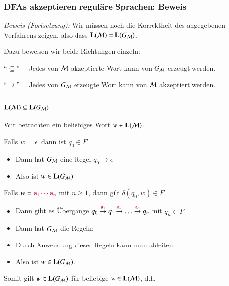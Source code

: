 \documentclass[aspectratio=1610,onlymath]{beamer}
\begin{document}
\begin{frame}\frametitle{DFAs akzeptieren reguläre Sprachen: Beweis}

\bigskip


\emph{Beweis (Fortsetzung):} Wir müssen noch die Korrektheit des angegebenen Verfahrens zeigen, also dass $\textbf{\textcolor{black}{L}}(\mathcal{M})=\textbf{\textcolor{black}{L}}(G_{\mathcal{M}})$.
\medskip

Dazu beweisen wir beide Richtungen einzeln:
\bigskip

\alert{"`$\subseteq$"'}~~ Jedes von $\mathcal{M}$ akzeptierte Wort kann von $G_{\mathcal{M}}$ erzeugt werden.
\bigskip

\alert{"`$\supseteq$"'}~~ Jedes von $G_{\mathcal{M}}$ erzeugte Wort kann von $\mathcal{M}$ akzeptiert werden.

\end{frame}

\begin{frame}\frametitle{$\textbf{\textcolor{black}{L}}(\mathcal{M})\subseteq\textbf{\textcolor{black}{L}}(G_{\mathcal{M}})$}

Wir betrachten ein beliebiges Wort $w\in\textbf{\textcolor{black}{L}}(\mathcal{M})$.\pause
\medskip

Falls $w=\epsilon$, dann ist $q_0\in F$.\pause
\begin{itemize}
\item Dann hat $G_{\mathcal{M}}$ eine Regel $q_0\to\epsilon$
\item Also ist $w\in\textbf{\textcolor{black}{L}}(G_{\mathcal{M}})$\pause
\end{itemize}
\medskip

Falls $w=\mathtt{\textcolor{purple}{a_1\cdots a_n}}$ mit $n\geq 1$, dann gilt $\delta(q_0,w)\in F$.\pause
\begin{itemize}
\item Dann gibt es Übergänge $q_0 \stackrel{\mathtt{\textcolor{purple}{a_1}}}{\to} q_1 \stackrel{\mathtt{\textcolor{purple}{a_2}}}{\to} \ldots \stackrel{\mathtt{\textcolor{purple}{a_n}}}{\to} q_n$ mit $q_n\in F$\pause
\item Dann hat $G_{\mathcal{M}}$ die Regeln: \\[1ex]
	\pause
\item Durch Anwendung dieser Regeln kann man ableiten:\\[1ex]
	\pause
\item Also ist $w\in\textbf{\textcolor{black}{L}}(G_{\mathcal{M}})$.
\end{itemize}

Somit gilt $w\in\textbf{\textcolor{black}{L}}(G_{\mathcal{M}})$ für beliebige $w\in\textbf{\textcolor{black}{L}}(\mathcal{M})$, d.h.

\end{frame}
\end{document}
